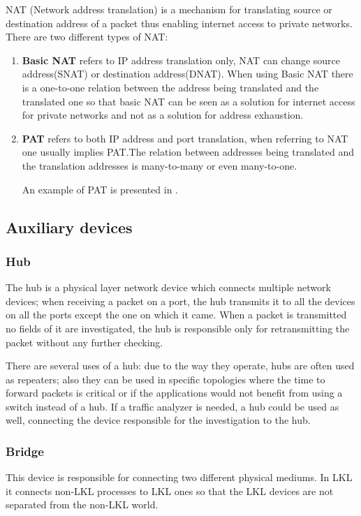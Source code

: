 NAT (Network address translation) is a mechanism for translating source or destination address of a packet thus 
enabling internet access to private networks. There are two different types of NAT:
\begin{enumerate}
\item \textbf{Basic NAT} refers to IP address translation only, NAT can change source address(SNAT) 
or destination address(DNAT). When using Basic NAT there is a one-to-one relation between the address 
being translated and the translated one so that basic NAT can be seen as a solution for internet access 
for private networks and not as a solution for address exhaustion.
\item \textbf{PAT} refers to both IP address and port translation, when referring to NAT one usually implies 
PAT.The relation between addresses being translated and the translation addresses is many-to-many or even many-to-one.

An example of PAT is presented in .
\end{enumerate}
\subsection{Auxiliary devices}
\label{sub-sec:auxdev}

\subsubsection{Hub}
The hub is a physical layer network device which connects multiple network devices; when receiving a packet 
on a port, the hub transmits it to all the devices on all the ports except the one on which it came. When a 
packet is transmitted no fields of it are investigated, the hub is responsible only for retransmitting the packet 
without any further checking.

There are several uses of a hub: due to the way they operate, hubs are often used as repeaters; also they can be 
used in specific topologies where the time to forward packets is critical or if the applications would not benefit 
from using a switch instead of a hub. If a traffic analyzer is needed, a hub could be used as well, connecting 
the device responsible for the investigation to the hub.
\subsubsection{Bridge}
This device is responsible for connecting two different physical mediums. In LKL it connects non-LKL processes to 
LKL ones so that the LKL devices are not separated from the non-LKL world.
